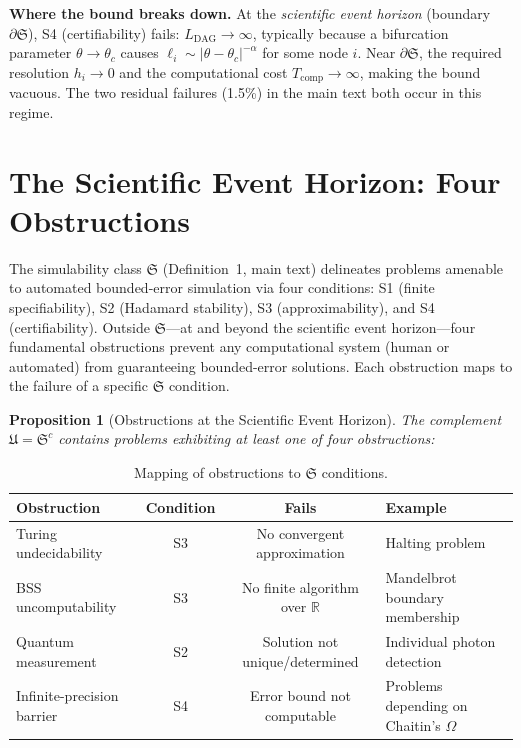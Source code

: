 \documentclass[11pt,a4paper]{article}
\newtheorem{proposition}[theorem]{Proposition}
\newcommand{\R}{\mathbb{R}}
\newcommand{\Sclass}{\mathfrak{S}}
\begin{document}
\textbf{Where the bound breaks down.} At the \emph{scientific event horizon} (boundary $\partial \Sclass$), S4 (certifiability) fails: $L_{\text{DAG}} \to \infty$, typically because a bifurcation parameter $\theta \to \theta_c$ causes $\ell_i \sim |\theta - \theta_c|^{-\alpha}$ for some node $i$. Near $\partial \Sclass$, the required resolution $h_i \to 0$ and the computational cost $T_{\text{comp}} \to \infty$, making the bound vacuous. The two residual failures (1.5\%) in the main text both occur in this regime.

\section{The Scientific Event Horizon: Four Obstructions}
\label{sec:s2}

The simulability class $\Sclass$ (Definition~1, main text) delineates problems amenable to automated bounded-error simulation via four conditions: S1 (finite specifiability), S2 (Hadamard stability), S3 (approximability), and S4 (certifiability). Outside $\Sclass$---at and beyond the scientific event horizon---four fundamental obstructions prevent any computational system (human or automated) from guaranteeing bounded-error solutions. Each obstruction maps to the failure of a specific $\Sclass$ condition.

\begin{proposition}[Obstructions at the Scientific Event Horizon]
The complement $\mathfrak{U} = \Sclass^c$ contains problems exhibiting at least one of four obstructions:
\end{proposition}

\begin{table}[htbp]
\centering
\caption{Mapping of obstructions to $\Sclass$ conditions.}
\small
\begin{tabularx}{\textwidth}{lccX}
\toprule
\textbf{Obstruction} & \textbf{Condition} & \textbf{Fails} & \textbf{Example} \\
\midrule
Turing undecidability & S3 & No convergent approximation & Halting problem \\
BSS uncomputability & S3 & No finite algorithm over $\R$ & Mandelbrot boundary membership \\
Quantum measurement & S2 & Solution not unique/determined & Individual photon detection \\
Infinite-precision barrier & S4 & Error bound not computable & Problems depending on Chaitin's $\Omega$ \\
\bottomrule
\end{tabularx}
\end{table}
\end{document}
